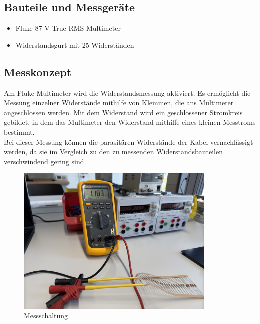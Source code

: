 \documentclass[a4paper,12pt]{article}
\begin{document}
\subsection{Bauteile und Messgeräte}
\begin{itemize}
\item Fluke 87 V True RMS Multimeter
\item Widerstandsgurt mit 25 Widerständen
\end{itemize}

\subsection{Messkonzept}
Am Fluke Multimeter wird die Widerstandsmessung aktiviert. Es ermöglicht die Messung einzelner Widerstände mithilfe von Klemmen, die ans Multimeter angeschlossen werden. Mit dem Widerstand wird ein geschlossener Stromkreis gebildet, in dem das Multimeter den Widerstand mithilfe eines kleinen Messtroms bestimmt.\\
\noindent Bei dieser Messung können die parasitären Widerstände der Kabel vernachlässigt werden, da sie im Vergleich zu den zu messenden Widerstandsbauteilen verschwindend gering sind.

\begin{figure}[H]
    \centering
    \includegraphics[width=0.85\textwidth]{../Quellen/Labor2/Fotos/IMG_4011.jpeg}
\caption{Messschaltung}
\end{figure}
\end{document}
